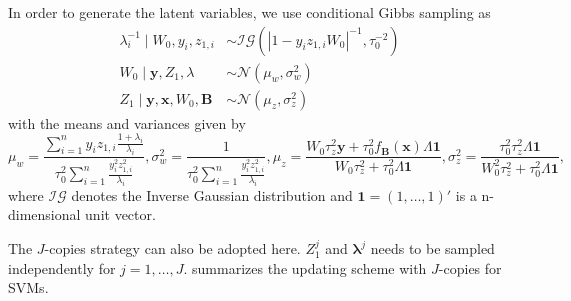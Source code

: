 \documentclass[ba]{imsart}
\newcommand{\bm}[1]{\boldsymbol{#1}}
\newcommand{\abs}[1]{\left\vert#1\right\vert}
\def\B{\bm{B}}
\def\mN{\mathcal{N}}
\newcommand{\bx}{{\bm x}}
\newcommand{\by}{{\bm y}}
\newcommand{\blambda}{{\bm \lambda}}
\numberwithin{equation}{section}
\theoremstyle{plain}
\begin{document}
In order to generate the latent variables, we use conditional Gibbs sampling as
\begin{align}
 \lambda_{i}^{-1}\mid W_0, y_i, z_{1,i} &\sim \mathcal{IG}(\abs{1-y_iz_{1,i}W_0}^{-1},{\tau_0^{-2}})\label{eq:lambda}\\
W_0 \mid \by, Z_1,\lambda & \sim \mN(\mu_w, \sigma_w^2)\label{eq:W0_bin}\\
Z_1\mid \by, \bx,W_0, \B & \sim \mN(\mu_z, \sigma_z^2)\label{eq:Z0_bin}
\end{align}
with the means and variances given by
\[
\mu_w=\frac{\sum_{i=1}^n y_i z_{1,i} \frac{1+\lambda_i}{\lambda_i}}{\tau_0^2\sum_{i=1}^n \frac{y_i^2z_{1,i}^2}{\lambda_i}}, 
\sigma_w^2=\frac{1}{\tau_0^2\sum_{i=1}^n \frac{y_i^2z_{1,i}^2}{\lambda_i}}, 
\mu_z=\frac{W_0\tau_z^2 \by+\tau_0^2f_{\B}(\bx)\Lambda\mathbf{1}}{W_0\tau_z^2+\tau_0^2\Lambda\mathbf{1}},
\sigma_z^2=\frac{\tau_0^2\tau_z^2\Lambda\mathbf{1}}{W_0^2\tau_z^2+\tau_0^2\Lambda\mathbf{1}},
\]
where $\mathcal{IG}$ denotes the Inverse Gaussian distribution and $\mathbf{1}=(1, \ldots, 1)'$ is a n-dimensional unit vector.

The $J$-copies strategy can also be adopted here. $Z_1^j$ and $\blambda^j$ needs to be sampled independently for $j=1, \ldots, J$.  summarizes the updating scheme with $J$-copies for SVMs. 
\end{document}
